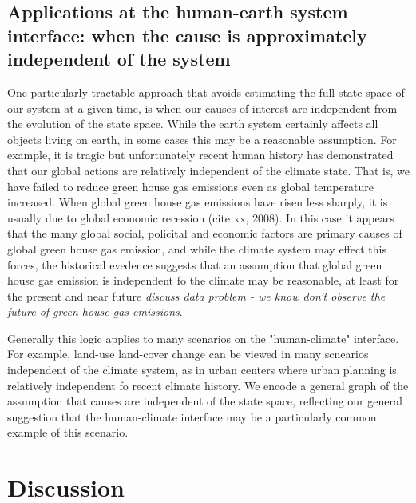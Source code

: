 \documentclass[12pt]{article}
\begin{document}
\subsection{Applications at the human-earth system interface: when the
cause is approximately independent of the system}
\label{human}

One particularly tractable approach that avoids estimating the full
state space of our system at a given time, is when our causes of
interest are independent from the evolution of the state space. While
the earth system certainly affects all objects living on earth, in
some cases this may be a reasonable assumption. For example, it is
tragic but unfortunately recent human history has demonstrated that
our global actions are relatively independent of the climate
state. That is, we have failed to reduce green house gas emissions
even as global temperature increased. When global green house gas
emissions have risen less sharply, it is usually due to global
economic recession (cite xx, 2008). In this case it appears that the
many global social, policital and economic factors are primary causes
of global green house gas emission, and while the climate system may
effect this forces, the historical evedence suggests that an
assumption that global green house gas emission is independent fo the
climate may be reasonable, at least for the present and near future
\emph{discuss data problem - we know don't observe the future of green
  house gas emissions}.

Generally this logic applies to many scenarios on the
"human-climate" interface. For example, land-use land-cover change
can be viewed in many scnearios independent of the climate system,
as in urban centers where urban planning is relatively independent
fo recent climate history. We encode a general graph of the
assumption that causes are independent of the state space,
reflecting our general suggestion that the human-climate interface
may be a particularly common example of this scenario.

\section{Discussion}
\end{document}
